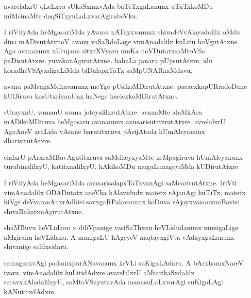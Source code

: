 \documentclass{article}
\begin{document}
\begin{mn}
avarelalxrU  oLeLxya  sUkaSxmxvAda  baTeTxgaLanunx  uTuTxkoMDu  miMcinaMte  daqSiTxyuLaLxvarAgirabeVku.
\end{mn}

\begin{mn}
I riVtiyAda  heMgasariMda  yAvanu  nATayxvanunx  shivadeVvAlayadalilx  oMdu  dina  mADisutAtxnoV  avanu  vaSaRdoLage  
vimAnadalilx  kuLitu  hoVgutAtxne.  Aga  avananunx  nUrujana  sitxrXVyaru  muKa  noVDutatxsaMtoVSa paDisutAtxre.  
yuvakanAgirutAtxne.  bahaLa  janaru  pUjisutAtxre.  idu  korxdheVSAyxdigaLiMda  biDalapxTaTx  saMpUNARnaMdavu.
\end{mn}

\begin{mn}
avanu  paMcagaMdhavanunx  meYge  pUsikoMDirutAtxne.  pacacxkapURradoDane  kUDiruva  kasUtxriyanUnx  haNege  hacicxkoMDirutAtxne.
\end{mn}

\begin{mn}
sUrayxnU,  yamanU  avana  joteyalilxrutAtxre.  avanaMte  alaMkAra mADikoMDiruva  heMgasaru  avananunx  anusarisutitxrutAtxre.  
avrelalxrU  AgaAneV  araLida  vAsane  barutitxruva  pArijAtada  hUmAleyanunx  dharisirutAtxre.
\end{mn}

\begin{mn}
elalxrU  pArxraMBavAgutitxruva  saMdheyxyaMte  keMpagiruva  hUmAleyanunx  turubinalilxyU,  katitxnalilxyU,  
hAkikoMDu  muguLunageyiMda  kUDirutAtxre
\end{mn}

\begin{mn}
I  riVtiyAda  heMgasariMda  anusarisalapxTaTxvanAgi  saMcarisutAtxne.  IriVti  vimAnadalilx  ODADutatx  
aneVka  kAlavidudx  matetx  rAjanAgi huTiTx,  matetx  hiVge  deVvaranAnxrAdhisi  savxgaRPalavanunx  koDuva  
rAjayxvananxnuBavisi  shivaBakatxnAgirutAtxne.
\end{mn}

\begin{mn}
shaMBuvu  heVLidanu :- diliVpanige  vasiSaThxnu  heVLidudanunx  munigaLige  aMgiranu  heVLidanu.  
A  munigaLU  hAgeyeV  naqtayxgiVta  vAdayxgaLanunx  shivanige  salilxsidaru.
\end{mn}

\begin{mn}
samagarxvAgi  padamxpurANavanunx  keVLi  suKigaLAdaru.  A  bArxhamxNareV  ivaru.  vimAnadalilx  kuLitidAdxre  
avarelalxrU  aMtarikaSxdalilx  saravxkAladalilxyU,  saMtoVSayutavAda  manasuLaLxvarAgi  suKigaLAgi  kANutitxdAdxre.
\end{mn}
\end{document}
